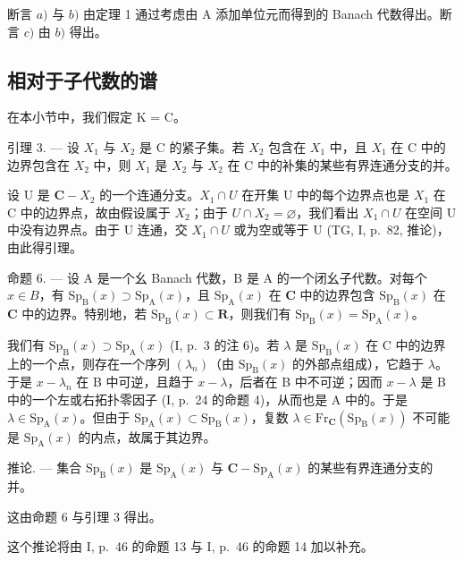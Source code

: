断言 \(a)\) 与 \(b)\) 由定理 1 通过考虑由 A 添加单位元而得到的 Banach 代数得出。断言 \(c)\) 由 \(b)\) 得出。

\subsection{相对于子代数的谱}

在本小节中，我们假定 K = C。

引理 3. --- 设 \(X_{1}\) 与 \(X_{2}\) 是 C 的紧子集。若 \(X_{2}\) 包含在 \(X_{1}\) 中，且 \(X_{1}\) 在 C 中的边界包含在 \(X_{2}\) 中，则 \(X_{1}\) 是 \(X_{2}\) 与 \(X_{2}\) 在 C 中的补集的某些有界连通分支的并。

设 U 是 \(\mathbf{C}-X_{2}\) 的一个连通分支。\(X_{1} \cap U\) 在开集 U 中的每个边界点也是 \(X_{1}\) 在 C 中的边界点，故由假设属于 \(X_{2}\)；由于 \(U \cap X_{2} = \varnothing\)，我们看出 \(X_{1} \cap U\) 在空间 U 中没有边界点。由于 U 连通，交 \(X_{1} \cap U\) 或为空或等于 U (TG, I, p.~82, 推论)，由此得引理。

命题 6. — 设 A 是一个幺 Banach 代数，B 是 A 的一个闭幺子代数。对每个 \(x \in B\)，有 \(\mathrm{Sp}_{\mathrm{B}}(x) \supset \mathrm{Sp}_{\mathrm{A}}(x)\)，且 \(\mathrm{Sp}_{\mathrm{A}}(x)\) 在 \(\mathbf{C}\) 中的边界包含 \(\mathrm{Sp}_{\mathrm{B}}(x)\) 在 \(\mathbf{C}\) 中的边界。特别地，若 \(\mathrm{Sp}_{\mathrm{B}}(x) \subset \mathbf{R}\)，则我们有 \(\mathrm{Sp}_{\mathrm{B}}(x) = \mathrm{Sp}_{\mathrm{A}}(x)\)。

我们有 \(\mathrm{Sp}_{\mathrm{B}}(x) \supset \mathrm{Sp}_{\mathrm{A}}(x)\) (I, p.~3 的注 6)。若 \(\lambda\) 是 \(\mathrm{Sp}_{\mathrm{B}}(x)\) 在 C 中的边界上的一个点，则存在一个序列 \((\lambda_{n})\)（由 \(\mathrm{Sp}_{\mathrm{B}}(x)\) 的外部点组成），它趋于 \(\lambda\)。于是 \(x - \lambda_{n}\) 在 B 中可逆，且趋于 \(x - \lambda\)，后者在 B 中不可逆；因而 \(x - \lambda\) 是 B 中的一个左或右拓扑零因子 (I, p.~24 的命题 4)，从而也是 A 中的。于是 \(\lambda \in \mathrm{Sp}_{\mathrm{A}}(x)\)。但由于 \(\mathrm{Sp}_{\mathrm{A}}(x) \subset \mathrm{Sp}_{\mathrm{B}}(x)\)，复数 \(\lambda \in \mathrm{Fr}_{\mathbf{C}}(\mathrm{Sp}_{\mathrm{B}}(x))\) 不可能是 \(\mathrm{Sp}_{\mathrm{A}}(x)\) 的内点，故属于其边界。

推论. --- 集合 \(\mathrm{Sp}_{\mathrm{B}}(x)\) 是 \(\mathrm{Sp}_{\mathrm{A}}(x)\) 与 \(\mathbf{C}-\mathrm{Sp}_{\mathrm{A}}(x)\) 的某些有界连通分支的并。

这由命题 6 与引理 3 得出。

这个推论将由 I, p.~46 的命题 13 与 I, p.~46 的命题 14 加以补充。

